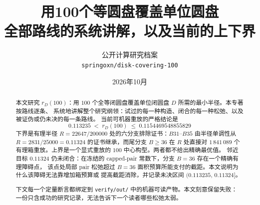\documentclass[UTF8,11pt]{ctexart}
\title{\bf 用100个等圆盘覆盖单位圆盘\\[2mm]
\large 全部路线的系统讲解，以及当前的上下界}
\author{公开计算研究档案\\\small \texttt{springoxn/disk-covering-100}}
\date{2026年10月}
\theoremstyle{definition}
\theoremstyle{remark}
\newcommand{\rD}{r_{D}}
\begin{document}
\maketitle

\begin{abstract}
\noindent
本文研究 $r_{D}(100)$：用 $100$ 个全等闭圆盘覆盖单位闭圆盘 $D$ 所需的最小半径。本专著按路线逐条、
系统地讲解整个研究纲领：试过的每一种构造、闭合的每一种松弛、以及被证伪或仍未决的每一条路线。
当前可机器重放的严格结论是
\[
\boxed{\;0.113235\;<\;\rD(100)\;\le\;0.1154469548855829\;}
\]
下界是有理半径 $R=22647/200000$ 处的六分支排除证书：$B31$--$B35$ 由半径单调性从
$R=2831/25000=0.11324$ 的证书继承，而尾分支 $B\ge36$ 在 $R$ 处直接对
$1\,841\,089$ 个有理箱重放。上界是一个显式重放的 $100$ 中心构型。两者都不给出精确最优值。
邻近目标 $0.11324$ 仍未闭合：在冻结的 capped-pair 常数下，分支 $B=36$ 存在一个精确有理障碍点，
该点处局部 pair 松弛超过 $B=36$ 面积预算所能支付的截距。本文说明为什么该障碍无法靠增加箱预算或
提高截距消除，并记录未决区间 $(0.113235,\,0.11324]$。

下文每一个定量断言都绑定到 \texttt{verify/out/} 中的机器可读产物。本文刻意保留失败：
一份只含成功的研究记录，无法告诉下一个读者哪些松弛太弱。
\end{abstract}

\tableofcontents











\end{document}
